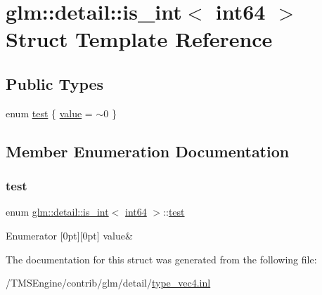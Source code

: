 \hypertarget{structglm_1_1detail_1_1is__int_3_01int64_01_4}{}\section{glm\+:\+:detail\+:\+:is\+\_\+int$<$ int64 $>$ Struct Template Reference}
\label{structglm_1_1detail_1_1is__int_3_01int64_01_4}
\subsection*{Public Types}
\begin{DoxyCompactItemize}
\item 
enum \hyperlink{structglm_1_1detail_1_1is__int_3_01int64_01_4_a6d738b326fc92804b0cffae571ac3e7f}{test} \{ \hyperlink{structglm_1_1detail_1_1is__int_3_01int64_01_4_a6d738b326fc92804b0cffae571ac3e7fa143df02d7060f75928a631355c601c08}{value} = $\sim$0
 \}
\end{DoxyCompactItemize}


\subsection{Member Enumeration Documentation}
\mbox{\label{structglm_1_1detail_1_1is__int_3_01int64_01_4_a6d738b326fc92804b0cffae571ac3e7f}} 
\subsubsection{\texorpdfstring{test}{test}}
{\footnotesize\ttfamily enum \hyperlink{structglm_1_1detail_1_1is__int}{glm\+::detail\+::is\+\_\+int}$<$ \hyperlink{namespaceglm_1_1detail_a5b1c3227ec636c24a0676746381adfc8}{int64} $>$\+::\hyperlink{structglm_1_1detail_1_1is__int_3_01int64_01_4_a6d738b326fc92804b0cffae571ac3e7f}{test}}

\begin{DoxyEnumFields}{Enumerator}
[0pt][0pt]{}\mbox{\label{structglm_1_1detail_1_1is__int_3_01int64_01_4_a6d738b326fc92804b0cffae571ac3e7fa143df02d7060f75928a631355c601c08}} 
value&\\
\hline

\end{DoxyEnumFields}


The documentation for this struct was generated from the following file\+:\begin{DoxyCompactItemize}
\item 
/\+T\+M\+S\+Engine/contrib/glm/detail/\hyperlink{type__vec4_8inl}{type\+\_\+vec4.\+inl}\end{DoxyCompactItemize}
